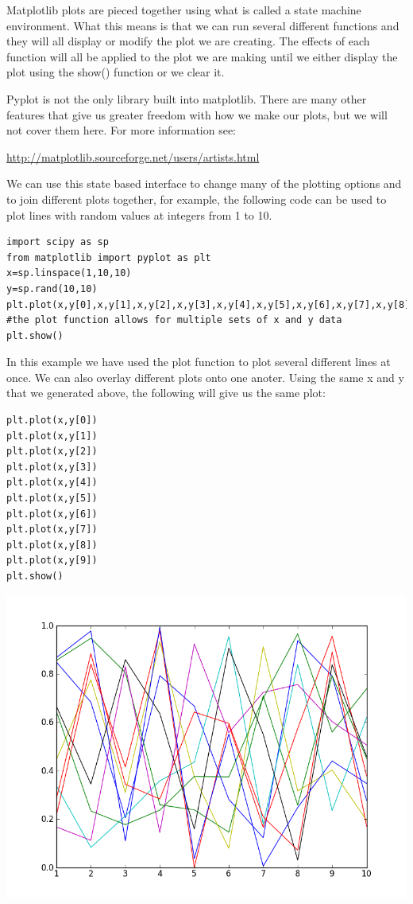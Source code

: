 Matplotlib plots are pieced together using what is called a state machine environment. What this means is that we can run several different functions and they will all display or modify the plot we are creating. The effects of each function will all be applied to the plot we are making until we either display the plot using the show() function or we clear it.

Pyplot is not the only library built into matplotlib. There are many other features that give us greater freedom with how we make our plots, but we will not cover them here. For more information see: 

\url{http://matplotlib.sourceforge.net/users/artists.html}

We can use this state based interface to change many of the plotting options and to join different plots together, for example, the following code can be used to plot lines with random values at integers from 1 to 10.

\begin{lstlisting}
import scipy as sp
from matplotlib import pyplot as plt
x=sp.linspace(1,10,10)
y=sp.rand(10,10)
plt.plot(x,y[0],x,y[1],x,y[2],x,y[3],x,y[4],x,y[5],x,y[6],x,y[7],x,y[8],x,y[9])  #the plot function allows for multiple sets of x and y data
plt.show()
\end{lstlisting}

In this example we have used the plot function to plot several different lines at once. We can also overlay different plots onto one anoter. Using the same x and y that we generated above, the following will give us the same plot:

\begin{lstlisting}
plt.plot(x,y[0])
plt.plot(x,y[1])
plt.plot(x,y[2])
plt.plot(x,y[3])
plt.plot(x,y[4])
plt.plot(x,y[5])
plt.plot(x,y[6])
plt.plot(x,y[7])
plt.plot(x,y[8])
plt.plot(x,y[9])
plt.show()
\end{lstlisting}

\includegraphics[width=\textwidth]{statemachineexample.png}


